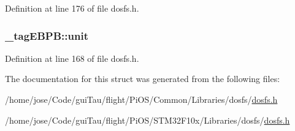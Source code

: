 Definition at line 176 of file dosfs.\-h.

\hypertarget{struct__tag_e_b_p_b_a80e1472a2611c1705dfbfe41a29cb20b}{
\subsubsection[{unit}]{ \-\_\-tag\-E\-B\-P\-B\-::unit}}\label{struct__tag_e_b_p_b_a80e1472a2611c1705dfbfe41a29cb20b}


Definition at line 168 of file dosfs.\-h.



The documentation for this struct was generated from the following files\-:\begin{DoxyCompactItemize}
\item 
/home/jose/\-Code/gui\-Tau/flight/\-Pi\-O\-S/\-Common/\-Libraries/dosfs/\hyperlink{_common_2_libraries_2dosfs_2dosfs_8h}{dosfs.\-h}\item 
/home/jose/\-Code/gui\-Tau/flight/\-Pi\-O\-S/\-S\-T\-M32\-F10x/\-Libraries/dosfs/\hyperlink{_s_t_m32_f10x_2_libraries_2dosfs_2dosfs_8h}{dosfs.\-h}\end{DoxyCompactItemize}
